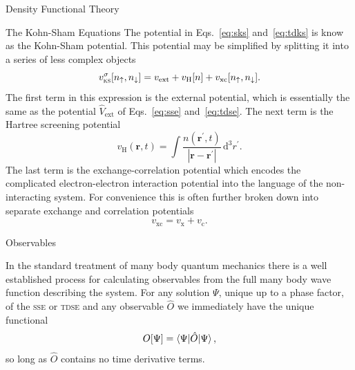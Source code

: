 \documentclass[letterpaper, 10 pt]{report}
\begin{document}
\begin{chapter}{Density Functional Theory \label{chap:dft}}
\begin{section}{The Kohn-Sham Equations \label{sec:ks}}
      The potential in Eqs.~\eqref{eq:sks} and~\eqref{eq:tdks} is know as the Kohn-Sham potential. This
      potential may be simplified by splitting it into a series of less complex objects
      \begin{equation} \label{eq:vks}
         v^\sigma_\mathrm{\textsc{ks}}[n_\uparrow, n_\downarrow] = v_\mathrm{ext} + v_\mathrm{H}[n]
            + v_\mathrm{xc}[n_\uparrow, n_\downarrow].
      \end{equation}
      The first term in this expression is the external potential, which is essentially the same as the
      potential $\hat{V}_\mathrm{ext}$ of Eqs.~\eqref{eq:sse} and~\eqref{eq:tdse}. The next term is
      the Hartree screening potential
      \begin{equation} \label{eq:vh}
         v_\mathrm{H}(\mathbf{r},t) = \int \frac{n(\mathbf{r}^\prime, t)}
            {\left| \mathbf{r} - \mathbf{r}^\prime\right|} \, \mathrm{d}^3 r^\prime.
      \end{equation}
      The last term is the exchange-correlation potential which encodes the complicated
      electron-electron interaction potential into the language of the non-interacting system. For
      convenience this is often further broken down into separate exchange and correlation potentials
      \begin{equation} \label{eq:vxc}
         v_\mathrm{xc} = v_\mathrm{x} + v_\mathrm{c}.
      \end{equation}

   \end{section}

   \begin{section}{Observables \label{sec:obs}}

      In the standard treatment of many body quantum mechanics there is a well established process for
      calculating observables from the full many body wave function describing the system. For any
      solution $\Psi$, unique up to a phase factor, of the \textsc{sse} or \textsc{tdse} and any
      observable $\hat{O}$ we immediately have the unique functional
      \begin{equation} \label{eq:obsfunc1}
         O[\Psi] = \braket{\Psi| \hat{O} | \Psi},
      \end{equation}
      so long as $\hat{O}$ contains no time derivative terms.


\end{section}
\end{chapter}
\end{document}
